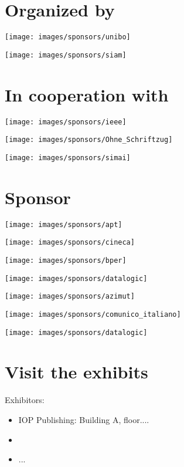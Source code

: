 \newpage
{}
\section*{Organized by}

\begin{multicols}{2}
\begin{center}
\texttt{[image: images/sponsors/unibo]}    

\vspace{1cm}
\texttt{[image: images/sponsors/siam]} 
\end{center}
\end{multicols}

\section*{In cooperation with}

\begin{multicols}{2}
\begin{center}
\texttt{[image: images/sponsors/ieee]}    

\vspace{1cm}
\texttt{[image: images/sponsors/Ohne\_Schriftzug]} 

\vspace{1cm}
\texttt{[image: images/sponsors/simai]}
\end{center}
\end{multicols}

\section*{Sponsor}

\begin{multicols}{2}
\begin{center}
\texttt{[image: images/sponsors/apt]}    

\vspace{1cm}
\texttt{[image: images/sponsors/cineca]} 

\vspace{1cm}
\texttt{[image: images/sponsors/bper]}

\vspace{1cm}
\texttt{[image: images/sponsors/datalogic]}

\vspace{1cm}
\texttt{[image: images/sponsors/azimut]}

\vspace{1cm}
\texttt{[image: images/sponsors/comunico\_italiano]} 
  
\vspace{1cm}
\texttt{[image: images/sponsors/datalogic]}
\end{center}
\end{multicols}

\newpage

\section*{Visit the exhibits}
Exhibitors:
\begin{itemize}
\item IOP Publishing: Building A, floor....
\item
\item ...
\end{itemize}
